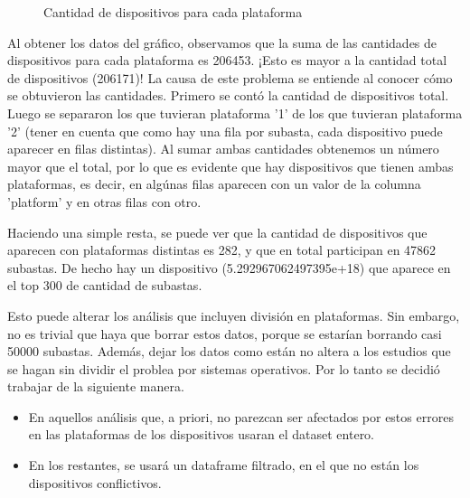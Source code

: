 \documentclass[a4paper, 12pt]{article}
\begin{document}
	\FloatBarrier
		\begin{figure}
			\centering
		   	\caption{Cantidad de dispositivos para cada plataforma}
			\label{devicesporSO}
		\end{figure}
	\FloatBarrier

	 Al obtener los datos del gráfico, observamos que la suma de las cantidades de dispositivos para cada plataforma es 206453. ¡Esto es mayor a la cantidad total de dispositivos (206171)!\newline
	 La causa de este problema se entiende al conocer cómo se obtuvieron las cantidades. Primero se contó la cantidad de dispositivos total. Luego se separaron los que tuvieran plataforma '1' de los que tuvieran plataforma '2' (tener en cuenta que como hay una fila por subasta, cada dispositivo puede aparecer en filas distintas). Al sumar ambas cantidades obtenemos un número mayor que el total, por lo que es evidente que hay dispositivos que tienen ambas plataformas, es decir, en algúnas filas aparecen con un valor de la columna 'platform' y en otras filas con otro.

	 Haciendo una simple resta, se puede ver que la cantidad de dispositivos que aparecen con plataformas distintas es 282, y que en total participan en 47862 subastas. De hecho hay un dispositivo (5.292967062497395e+18) que aparece en el top 300 de cantidad de subastas.

	 Esto puede alterar los análisis que incluyen división en plataformas. Sin embargo, no es trivial que haya que borrar estos datos, porque se estarían borrando casi 50000 subastas. Además, dejar los datos como están no altera a los estudios que se hagan sin dividir el problea por sistemas operativos. Por lo tanto se decidió trabajar de la siguiente manera.
	\begin{itemize}
		\item En aquellos análisis que, a priori, no parezcan ser afectados por estos errores en las plataformas de los dispositivos usaran el dataset entero.
		\item En los restantes, se usará un dataframe filtrado, en el que no están los dispositivos conflictivos.
	\end{itemize}
	
\end{document}
